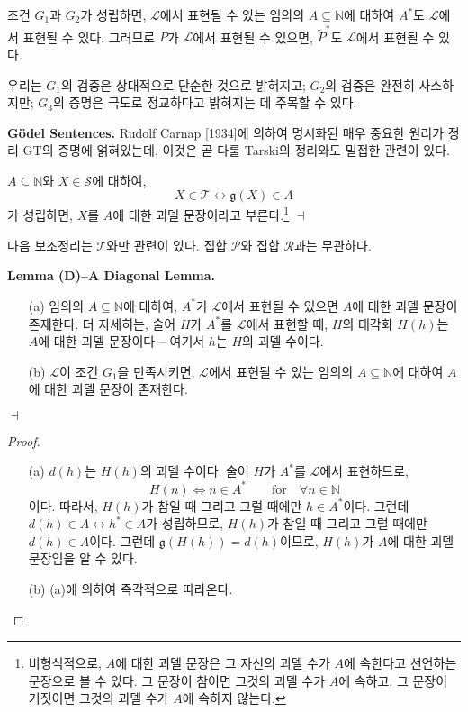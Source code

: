 \documentclass[12pt]{paper}
\newcommand{\gnum}{ \mathfrak{g} }
\newenvironment{context}[1][]{\noindent \textbf{{#1}.}}{\hfill $ \dashv $}
\begin{document}
  조건 $G_{1}$과 $G_{2}$가 성립하면,
  $\mathcal{L}$에서 표현될 수 있는 임의의 $A \subseteq \mathbb{N}$에 대하여 $A^{*}$도 $\mathcal{L}$에서 표현될 수 있다.
  그러므로 $P$가 $\mathcal{L}$에서 표현될 수 있으면,
  $\tilde{P}^{*}$도 $\mathcal{L}$에서 표현될 수 있다.

  우리는 $G_{1}$의 검증은 상대적으로 단순한 것으로 밝혀지고; $G_{2}$의 검증은 완전히 사소하지만; $G_{3}$의 증명은 극도로 정교하다고 밝혀지는 데 주목할 수 있다.

  \begin{context}[G\"odel Sentences]
    Rudolf Carnap [1934]에 의하여 명시화된 매우 중요한 원리가 정리 GT의 증명에 얽혀있는데,
    이것은 곧 다룰 Tarski의 정리와도 밀접한 관련이 있다.

    $A \subseteq \mathbb{N}$와 $X \in \mathcal{S}$에 대하여,
    $$X \in \mathcal{T} \leftrightarrow \gnum \left( X \right) \in A$$가 성립하면,
    $X$를 $A$에 대한 괴델 문장이라고 부른다.\footnote
    {
      비형식적으로, $A$에 대한 괴델 문장은 그 자신의 괴델 수가 $A$에 속한다고 선언하는 문장으로 볼 수 있다.
      그 문장이 참이면 그것의 괴델 수가 $A$에 속하고, 그 문장이 거짓이면 그것의 괴델 수가 $A$에 속하지 않는다.
    }
  \end{context}

  다음 보조정리는 $\mathcal{T}$와만 관련이 있다.
  집합 $\mathcal{P}$와 집합 $\mathcal{R}$과는 무관하다.

  \begin{context}[Lemma (D)--A Diagonal Lemma]
    \begin{itemize}
      \item[(a)] 임의의 $A \subseteq \mathbb{N}$에 대하여, $A^{*}$가 $\mathcal{L}$에서 표현될 수 있으면 $A$에 대한 괴델 문장이 존재한다.
      더 자세히는, 술어 $H$가 $A^{*}$를 $\mathcal{L}$에서 표현할 때, $H$의 대각화 $H \left( h \right)$는 $A$에 대한 괴델 문장이다 --
      여기서 $h$는 $H$의 괴델 수이다.
      \item[(b)] $\mathcal{L}$이 조건 $G_{1}$을 만족시키면, $\mathcal{L}$에서 표현될 수 있는 임의의 $A \subseteq \mathbb{N}$에 대하여 $A$에 대한 괴델 문장이 존재한다.
    \end{itemize}
  \end{context}

  \begin{proof}
    \begin{itemize}
      \item[(a)] $d \left( h \right)$는 $H \left( h \right)$의 괴델 수이다.
      술어 $H$가 $A^{*}$를 $\mathcal{L}$에서 표현하므로,
      $$ H \left( n \right) \iff n \in A^{*} \qquad \mathrm{for} \quad \forall n \in \mathbb{N} $$이다.
      따라서, $H \left( h \right)$가 참일 때 그리고 그럴 때에만 $h \in A^{*}$이다.
      그런데 $d \left( h \right) \in A \leftrightarrow h^{*} \in A$가 성립하므로,
      $H \left( h \right)$가 참일 때 그리고 그럴 때에만 $d \left( h \right) \in A$이다.
      그런데 $\gnum \left( H \left( h \right) \right) = d \left( h \right)$이므로,
      $H \left( h \right)$가 $A$에 대한 괴델 문장임을 알 수 있다.
      
      \item[(b)] (a)에 의하여 즉각적으로 따라온다.
    \end{itemize}
  \end{proof}
\end{document}
